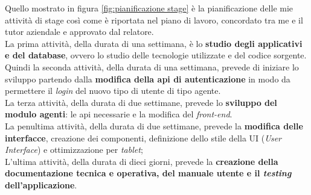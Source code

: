 Quello mostrato in figura \ref{fig:pianificazione stage} è la pianificazione delle mie attività di stage 
così come è riportata nel piano di lavoro, concordato tra me e il tutor aziendale e approvato dal relatore.\\
La prima attività, della durata di una settimana, è lo \textbf{studio degli applicativi e del database}, ovvero 
lo studio delle tecnologie utilizzate e del codice sorgente.\\
Quindi la seconda attività, della durata di una settimana, prevede di iniziare lo sviluppo partendo dalla \textbf{modifica 
della \gls{api} di autenticazione} in modo da permettere il \textit{login} del nuovo tipo di utente di tipo agente.\\
La terza attività, della durata di due settimane, prevede lo \textbf{sviluppo del modulo agenti}: le \gls{api} necessarie e la modifica del \textit{front-end}.\\
La penultima attività, della durata di due settimane, prevede la \textbf{modifica delle interfacce}, creazione dei componenti, 
definizione dello stile della UI (\textit{User Interface}) e ottimizzazione per \textit{tablet};\\
L'ultima attività, della durata di dieci giorni, prevede la \textbf{creazione della documentazione tecnica e operativa, 
del manuale utente e il \textit{testing} dell'applicazione}.